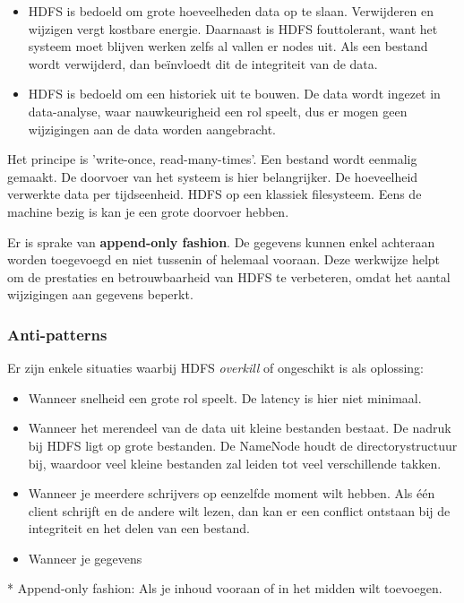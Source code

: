 \documentclass[a4paper,10pt,twoside]{report}
\begin{document}
\begin{itemize}
	\item HDFS is bedoeld om grote hoeveelheden data op te slaan. Verwijderen en wijzigen vergt kostbare energie. Daarnaast is HDFS fouttolerant, want het systeem moet blijven werken zelfs al vallen er nodes uit. Als een bestand wordt verwijderd, dan beïnvloedt dit de integriteit van de data.
	\item HDFS is bedoeld om een historiek uit te bouwen. De data wordt ingezet in data-analyse, waar nauwkeurigheid een rol speelt, dus er mogen geen wijzigingen aan de data worden aangebracht.
\end{itemize}

Het principe is 'write-once, read-many-times'. Een bestand wordt eenmalig gemaakt. De doorvoer van het systeem is hier belangrijker. De hoeveelheid verwerkte data per tijdseenheid. HDFS op een klassiek filesysteem. Eens de machine bezig is kan je een grote doorvoer hebben. 

Er is sprake van \textbf{append-only fashion}. De gegevens kunnen enkel achteraan worden toegevoegd en niet tussenin of helemaal vooraan. Deze werkwijze helpt om de prestaties en betrouwbaarheid van HDFS te verbeteren, omdat het aantal wijzigingen aan gegevens beperkt. 

\subsubsection{Anti-patterns}

Er zijn enkele situaties waarbij HDFS \textit{overkill} of ongeschikt is als oplossing:

\begin{itemize}
	\item Wanneer snelheid een grote rol speelt. De latency is hier niet minimaal.
	\item Wanneer het merendeel van de data uit kleine bestanden bestaat. De nadruk bij HDFS ligt op grote bestanden. De NameNode houdt de directorystructuur bij, waardoor veel kleine bestanden zal leiden tot veel verschillende takken.
	\item Wanneer je meerdere schrijvers op eenzelfde moment wilt hebben. Als één client schrijft en de andere wilt lezen, dan kan er een conflict ontstaan bij de integriteit en het delen van een bestand.
	\item Wanneer je gegevens
\end{itemize}

* Append-only fashion: Als je inhoud vooraan of in het midden wilt toevoegen.
\end{document}
